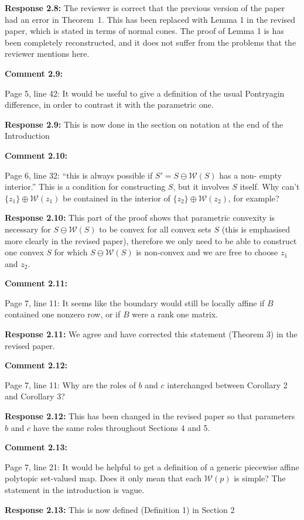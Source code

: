 \documentclass[11pt, a4paper]{article}
\newcommand{\comment}[1]{{%
\begin{sffamily}\leavevmode\color{black}#1
\end{sffamily}}}%
\def\v{\vspace{2mm}}
\begin{document}
\v
\textbf{Response 2.8:}
The reviewer is correct that the previous version of the paper had an error in Theorem~1. This has been replaced with Lemma 1 in the revised paper, which is stated in terms of normal cones. The proof of Lemma 1 is has been completely reconstructed, and it does not suffer from the problems that the reviewer mentions here.

\v
\textbf{Comment 2.9:}
\comment{
Page 5, line 42: It would be useful to give a definition of the usual Pontryagin difference, in order to contrast it with the parametric one.
}

\v
\textbf{Response 2.9:}
This is now done in the section on notation  at the end of the Introduction 


\v
\textbf{Comment 2.10:}
\comment{
 Page 6, line 32: ``this is always possible if $S' = S \ominus \mathcal W(S)$ has a non- empty interior.'' This is a condition for constructing $S$, but it involves $S$ itself. Why can’t $\{z_1\} \oplus \mathcal W(z_1)$ be contained in the interior of $\{z_2\} \oplus \mathcal W(z_2)$, for example?
}

\v
\textbf{Response 2.10:}
This part of the proof shows that parametric convexity is necessary for $ S \ominus \mathcal W(S)$ to be convex for all convex sets $S$ (this is emphasised more clearly in the revised paper), therefore we only need to be able to construct one convex $S$ for which $ S \ominus \mathcal W(S)$ is non-convex and we are free to choose $z_1$ and $z_2$.

\v
\textbf{Comment 2.11:}
\comment{
Page 7, line 11: It seems like the boundary would still be locally affine if $B$ contained one nonzero row, or if $B$ were a rank one matrix.
}

\v
\textbf{Response 2.11:}
We agree and have corrected this statement (Theorem 3) in the revised paper.

\v
\textbf{Comment 2.12:}
\comment{Page 7, line 11: Why are the roles of $b$ and $c$ interchanged between Corollary 2 and Corollary 3?}

\v
\textbf{Response 2.12:}
This has been changed in the revised paper so that parameters $b$ and $c$ have the same roles throughout Sections 4 and 5.

\v
\textbf{Comment 2.13:}
\comment{
Page 7, line 21: It would be helpful to get a definition of a generic piecewise affine polytopic set-valued map. Does it only mean that each $\mathcal W(p)$ is simple? The statement in the introduction is vague.}

\v
\textbf{Response 2.13:}
This is now defined (Definition 1) in Section 2
\end{document}
